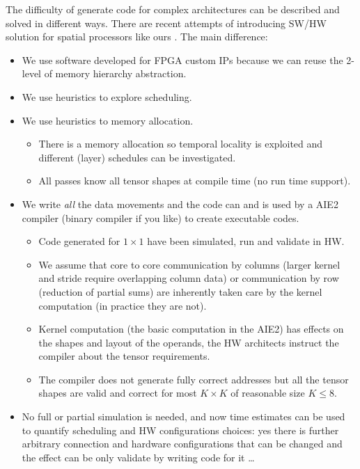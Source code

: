 \documentclass[conference]{IEEEtran}
\begin{document}
The difficulty of generate code for complex architectures can be
described and solved in different ways. There are recent attempts of
introducing SW/HW solution for spatial processors like ours
\cite{Huang2021CoSASB,Russo2023MemoryAwareDA,Cai2023InterlayerSS}. The
main difference:
\begin{itemize}
   \item We use software developed for FPGA custom IPs because we can
     reuse the 2-level of memory hierarchy abstraction.
   \item We use heuristics to explore scheduling.
   \item We use heuristics to memory allocation.
     \begin{itemize}
     \item There is a memory allocation so temporal locality is
       exploited and different (layer) schedules can be investigated.
     \item All passes know all tensor shapes at compile time (no run
       time support).
     \end{itemize}
   \item We write {\em all} the data movements and the code can and is
     used by a AIE2 compiler (binary compiler if you like) to create
     executable codes.
     \begin{itemize}
     \item Code generated for $1\times 1$ have been simulated, run and
       validate in HW.
     \item We assume that core to core communication by columns
       (larger kernel and stride require overlapping column data) or
       communication by row (reduction of partial sums) are inherently
       taken care by the kernel computation (in practice they are
       not).
     \item Kernel computation (the basic computation in the AIE2) has
       effects on the shapes and layout of the operands, the HW
       architects instruct the compiler about the tensor requirements.
     \item The compiler does not generate fully correct addresses but
       all the tensor shapes are valid and correct for most $K\times
       K$ of reasonable size $K\leq 8$.
     \end{itemize}
   \item No full or partial simulation is needed, and now time
     estimates can be used to quantify scheduling and HW
     configurations choices: yes there is further arbitrary connection
     and hardware configurations that can be changed and the effect
     can be only validate by writing code for it \dots
\end{itemize}
\end{document}
